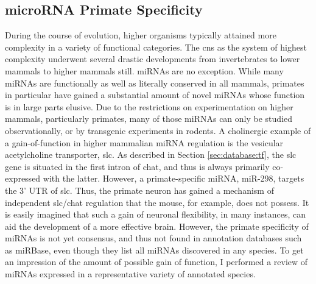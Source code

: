 \subsection{microRNA Primate Specificity}
During the course of evolution, higher organisms typically attained more complexity in a variety of functional categories. The \ac{cns} as the system of highest complexity underwent several drastic developments from invertebrates to lower mammals to higher mammals still. miRNAs are no exception. While many miRNAs are functionally as well as literally conserved in all mammals, primates in particular have gained a substantial amount of novel miRNAs whose function is in large parts elusive. Due to the restrictions on experimentation on higher mammals, particularly primates, many of those miRNAs can only be studied observationally, or by transgenic experiments in rodents. A cholinergic example of a gain-of-function in higher mammalian miRNA regulation is the vesicular acetylcholine transporter, \ac{slc}. As described in Section \ref{sec:database:tf}, the \ac{slc} gene is situated in the first intron of \ac{chat}, and thus is always primarily co-expressed with the latter. However, a primate-specific miRNA, miR-298, targets the 3' UTR of \ac{slc}.\cite{Soreq2015} Thus, the primate neuron has gained a mechanism of independent \ac{slc}/\ac{chat} regulation that the mouse, for example, does not possess. It is easily imagined that such a gain of neuronal flexibility, in many instances, can aid the development of a more effective brain. However, the primate specificity of miRNAs is not yet consensus, and thus not found in annotation databases such as miRBase, even though they list all miRNAs discovered in any species. To get an impression of the amount of possible gain of function, I performed a review of miRNAs expressed in a representative variety of annotated species.

